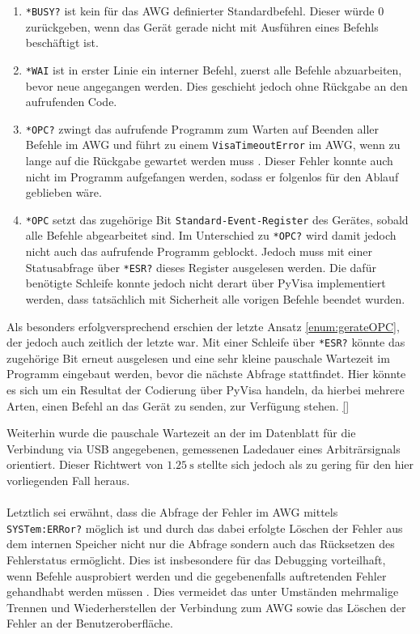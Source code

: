 \documentclass[../Report.tex]{subfiles}
\begin{document}
\begin{enumerate}
	\item \lstinline{*BU}\lstinline{SY?} ist kein für das AWG definierter Standardbefehl. Dieser würde 0 zurückgeben, wenn das Gerät gerade nicht mit Ausführen eines Befehls beschäftigt ist.
	
	\item \lstinline{*WA}\lstinline{I} ist in erster Linie ein interner Befehl, zuerst alle Befehle abzuarbeiten, bevor neue angegangen werden. Dies geschieht jedoch ohne Rückgabe an den aufrufenden Code.
	
	\item \lstinline{*OPC?} zwingt das aufrufende Programm zum Warten auf Beenden aller Befehle im AWG und führt zu einem \lstinline{VisaTimeoutError} im AWG, wenn zu lange auf die Rückgabe gewartet werden muss \cite[S. 9]{troeser13}. Dieser Fehler konnte auch nicht im Programm aufgefangen werden, sodass er folgenlos für den Ablauf geblieben wäre.
	
	\item \label{enum:gerateOPC}\lstinline{*OPC} setzt das zugehörige Bit \lstinline{Standard-Event-Register} des Gerätes, sobald alle Befehle abgearbeitet sind. Im Unterschied zu \lstinline{*OPC?} wird damit jedoch nicht auch das aufrufende Programm geblockt. Jedoch muss mit einer Statusabfrage über \lstinline{*ESR?} dieses Register ausgelesen werden. Die dafür benötigte Schleife konnte jedoch nicht derart über PyVisa implementiert werden, dass tatsächlich mit Sicherheit alle vorigen Befehle beendet wurden.

\end{enumerate}

Als besonders erfolgversprechend erschien der letzte Ansatz \ref{enum:gerateOPC}, der jedoch auch zeitlich der letzte war. Mit einer Schleife über \lstinline{*ESR?} könnte das zugehörige Bit erneut ausgelesen und eine sehr kleine pauschale Wartezeit im Programm eingebaut werden, bevor die nächste Abfrage stattfindet. Hier könnte es sich um ein Resultat der Codierung über PyVisa handeln, da hierbei mehrere Arten, einen Befehl an das Gerät zu senden, zur Verfügung stehen. \ref{}

Weiterhin wurde die pauschale Wartezeit an der im Datenblatt \cite[S. 21]{keysData14} für die Verbindung via USB angegebenen, gemessenen Ladedauer eines Arbiträrsignals orientiert. Dieser Richtwert von $\SI{1.25}{\s}$ stellte sich jedoch als zu gering für den hier vorliegenden Fall heraus.
\\
\\
Letztlich sei erwähnt, dass die Abfrage der Fehler im AWG mittels  \lstinline{SYSTem:ERRor?} möglich ist und durch das dabei erfolgte Löschen der Fehler aus dem internen Speicher nicht nur die Abfrage sondern auch das Rücksetzen des Fehlerstatus ermöglicht. Dies ist insbesondere für das Debugging vorteilhaft, wenn Befehle ausprobiert werden und die gegebenenfalls auftretenden Fehler gehandhabt werden müssen \cite[S. 454]{keysHand15}. Dies vermeidet das unter Umständen mehrmalige Trennen und Wiederherstellen der Verbindung zum AWG sowie das Löschen der Fehler an der Benutzeroberfläche.
\end{document}
